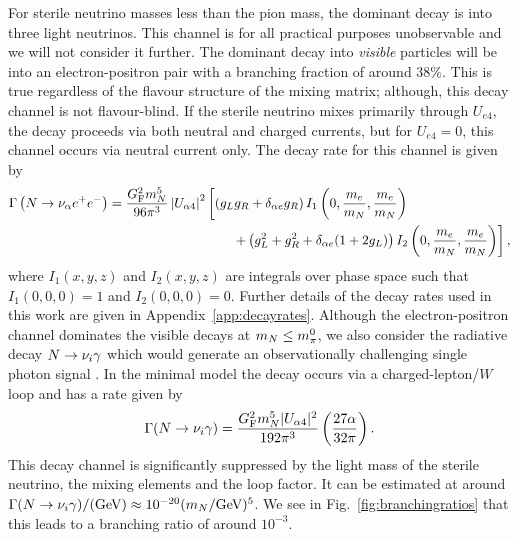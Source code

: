 \documentclass[11pt, a4paper]{article}
\newcommand{\reffig}[1]{Fig.~\ref{#1}}
\newcommand{\refapp}[1]{Appendix~\ref{#1}}
\def\ster{\ensuremath N}
\begin{document}
For sterile neutrino masses less than the pion mass, the dominant decay is into
three light neutrinos. This channel is for all practical purposes unobservable
and we will not consider it further. The dominant decay into \emph{visible}
particles will be into an electron-positron pair with a branching fraction of
around $38\%$. 
%
This is true regardless of the flavour structure of the mixing matrix;
although, this decay channel is not flavour-blind. If the sterile neutrino
mixes primarily through $U_{e4}$, the decay proceeds via both neutral and
charged currents, but for $U_{e4}=0$, this channel occurs via neutral current
only. The decay rate for this channel is given by 
%
\begin{align*} \Gamma\left(\ster\to \nu_\alpha e^+e^-\right) =
\frac{G_\text{F}^2m_\ster^5}{96\pi^3}\left|U_{\alpha 4}\right|^2&\left[\left(
g_Lg_R + \delta_{\alpha e}g_R\right)I_1\left(0,\frac{m_e}{m_\ster}, \frac{
m_e}{m_\ster}\right)\right.\\ &\left.\qquad + \left(g_L^2 + g_R^2 +
\delta_{\alpha
e}(1+2g_L)\right)I_2\left(0,\frac{m_e}{m_\ster},\frac{m_e}{m_\ster}\right)\right],
\end{align*}
%
where $I_1(x,y,z)$ and $I_2(x,y,z)$ are integrals over phase space such that
$I_1(0,0,0) = 1$ and $I_2(0,0,0) = 0$. Further details of the decay rates used
in this work are given in \refapp{app:decayrates}.
%
%
%
Although the electron-positron channel dominates the visible decays at $m_\ster
\leq m_\pi^0$, we also consider the radiative decay $\ster\to\nu_i\gamma$ which
would generate an observationally challenging single photon signal
\cite{PhysRevD.25.766}. In the minimal model the decay occurs via a
charged-lepton/$W$ loop and has a rate given by
%
\[ \Gamma(\ster\to\nu_i\gamma) = \frac{G_\text{F}^2m_\ster^5 |U_{\alpha
4}|^2}{192 \pi^3} \left( \frac{27 \alpha}{32 \pi} \right). \]
%
This decay channel is significantly suppressed by the light mass of the sterile
neutrino, the mixing elements and the loop factor. It can be estimated at
around $\Gamma(\ster\to\nu_i\gamma)/(\text{GeV}) \approx 10^{-20}
(m_\ster/\text{GeV})^5$. We see in \reffig{fig:branchingratios} that this leads
to a branching ratio of around $10^{-3}$.
\end{document}
